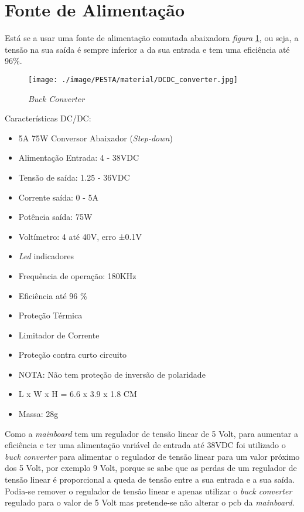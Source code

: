 \section{Fonte de Alimentação}
Está se a usar uma fonte de alimentação comutada abaixadora \textit{figura} \ref{buck-converter}, ou seja, a tensão na sua saída é sempre inferior a da sua entrada e tem uma eficiência até 96\%.
\\
\begin{minipage}[!b]{.5\linewidth}
	\begin{figure}[H]
		\captionsetup{justification=raggedright,singlelinecheck=false}
		\flushleft
		\texttt{[image: ./image/PESTA/material/DCDC\_converter.jpg]}
		\caption{\textit{Buck Converter}}
		\label{buck-converter}
	\end{figure}
\end{minipage}
\begin{minipage}[!b]{.5\linewidth}
\small
Características DC/DC:
	\begin{itemize}
		\setlength\itemsep{-0.5em}
		\footnotesize
		\item 5A 75W Conversor Abaixador (\textit{Step-down})
		\item Alimentação Entrada: 4 - 38VDC
		\item Tensão de saída: 1.25 - 36VDC
		\item Corrente saída: 0 - 5A
		\item Potência saída: 75W
		\item Voltímetro: 4 até 40V, erro ±0.1V
		\item \textit{Led} indicadores
		\item Frequência de operação: 180KHz
		\item Eficiência até 96 \%
		\item Proteção Térmica
		\item Limitador de Corrente
		\item Proteção contra curto circuito
		\item NOTA: Não tem proteção de inversão de polaridade
		\item L x W x H = 6.6 x 3.9 x 1.8 CM
		\item Massa: 28g
	\end{itemize}
\end{minipage}
Como a \textit{mainboard} tem um regulador de tensão linear de 5 Volt, para aumentar a eficiência e ter uma alimentação variável de entrada até 38VDC foi utilizado o \textit{buck converter} para alimentar o regulador de tensão linear para um valor próximo dos 5 Volt, por exemplo 9 Volt, porque se sabe que as perdas de um regulador de tensão linear é proporcional a queda de tensão entre a sua entrada e a sua saída. Podia-se remover o regulador de tensão linear e apenas utilizar o \textit{buck converter} regulado para o valor de 5 Volt mas pretende-se não alterar o \acs{pcb} da \textit{mainboard}.
